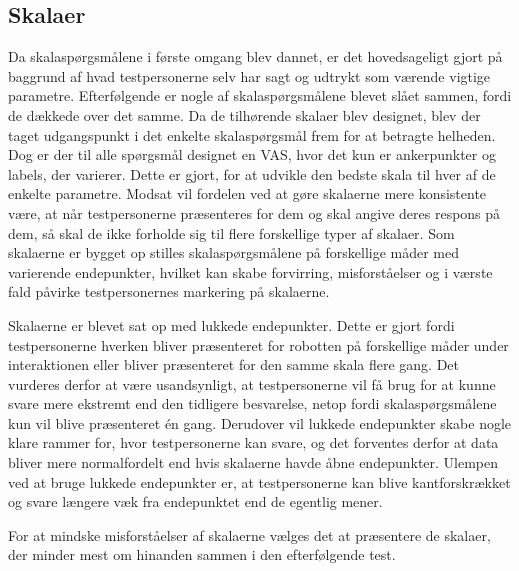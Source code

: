 \subsection{Skalaer}
\label{DiskussionSkalaer}
%
Da skalaspørgsmålene i første omgang blev dannet, er det hovedsageligt gjort på baggrund af hvad testpersonerne selv har sagt og udtrykt som værende vigtige parametre. Efterfølgende er nogle af skalaspørgsmålene blevet slået sammen, fordi de dækkede over det samme. Da de tilhørende skalaer blev designet, blev der taget udgangspunkt i det enkelte skalaspørgsmål frem for at betragte helheden. Dog er der til alle spørgsmål designet en VAS, hvor det kun er ankerpunkter og labels, der varierer. Dette er gjort, for at udvikle den bedste skala til hver af de enkelte parametre. Modsat vil fordelen ved at gøre skalaerne mere konsistente være, at når testpersonerne præsenteres for dem og skal angive deres respons på dem, så skal de ikke forholde sig til flere forskellige typer af skalaer. Som skalaerne er bygget op stilles skalaspørgsmålene på forskellige måder med varierende endepunkter, hvilket kan skabe forvirring, misforståelser og i værste fald påvirke testpersonernes markering på skalaerne. 

Skalaerne er blevet sat op med lukkede endepunkter. Dette er gjort fordi testpersonerne hverken bliver præsenteret for robotten på forskellige måder under interaktionen eller bliver præsenteret for den samme skala flere gang. Det vurderes derfor at være usandsynligt, at testpersonerne vil få brug for at kunne svare mere ekstremt end den tidligere besvarelse, netop fordi skalaspørgsmålene kun vil blive præsenteret én gang. Derudover vil lukkede endepunkter skabe nogle klare rammer for, hvor testpersonerne kan svare, og det forventes derfor at data bliver mere normalfordelt end hvis skalaerne havde åbne endepunkter. Ulempen ved at bruge lukkede endepunkter er, at testpersonerne kan blive kantforskrækket og svare længere væk fra endepunktet end de egentlig mener. 

For at mindske misforståelser af skalaerne vælges det at præsentere de skalaer, der minder mest om hinanden sammen i den efterfølgende test.